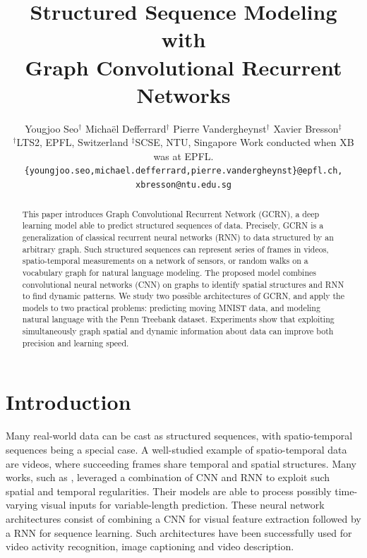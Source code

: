\documentclass{article}
\title{Structured Sequence Modeling with \\ Graph Convolutional Recurrent Networks}
\author{
	Yougjoo Seo$^\dagger$ \hspace {.6cm} Michaël Defferrard$^\dagger$  \hspace{.6cm} Pierre Vandergheynst$^\dagger$ \hspace{.6cm} Xavier Bresson$^\ddagger$ \\
	$^\dagger$LTS2, EPFL, Switzerland \hspace{0.4cm}
	$^\ddagger$SCSE, NTU, Singapore \hspace{0.4cm}
	{\small Work conducted when XB was at EPFL.} \\
	{\tt\small \{youngjoo.seo,michael.defferrard,pierre.vandergheynst\}@epfl.ch, xbresson@ntu.edu.sg}
}
\begin{document}
\maketitle

\begin{abstract}
	This paper introduces Graph Convolutional Recurrent
	Network (GCRN), a deep learning model able to predict structured
	sequences of data. Precisely, GCRN is a generalization of classical recurrent neural networks (RNN) to
	data structured by an arbitrary graph. 
	Such structured sequences can represent series of frames in videos, spatio-temporal measurements on a network of
	sensors, or random walks on a vocabulary graph for natural language modeling.
	The proposed model combines convolutional neural networks (CNN) on graphs to identify spatial structures and RNN to find dynamic patterns. We study two possible architectures of GCRN, and apply the models to two practical
	problems: predicting moving MNIST data, and modeling natural language with the Penn
	Treebank dataset. Experiments show that exploiting simultaneously graph spatial and dynamic information about data can improve both precision and learning speed.
\end{abstract}

\section{Introduction}


Many real-world data can be cast as structured sequences, with spatio-temporal
sequences being a special case. A well-studied example of spatio-temporal data are videos, where
succeeding frames share temporal and spatial structures. Many works, such as \citet{cnnlstm1, cnnlstm2, cnnlstm3},  leveraged a combination of CNN and RNN to exploit such spatial and
temporal regularities. Their models are able to process possibly time-varying
visual inputs for variable-length prediction. These neural network architectures consist of combining
a CNN for visual feature extraction followed by a RNN for sequence learning. Such
architectures have been successfully used for video activity recognition, image
captioning and video description.
\end{document}

